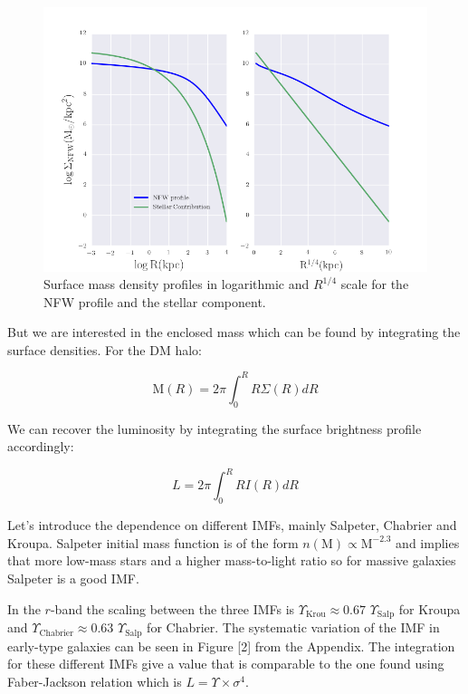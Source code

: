 \begin{figure}[]
\centering
\includegraphics[width=12cm]{images/Surface_mass_density_log.png}
\caption[Surface mass density profiles]{Surface mass density profiles in logarithmic and $R^{1/4}$ scale for the NFW profile and the stellar component.}
\end{figure}

But we are interested in the enclosed mass which can be found by integrating the surface densities. For the DM halo:

\begin{equation}
\textrm{M}(R)=2\pi \int_{0}^{R} R\Sigma(R)dR
\end{equation}

We can recover the luminosity by integrating the surface brightness profile accordingly:

\begin{equation}
L=2\pi \int_{0}^{R} RI(R)dR
\end{equation}

Let's introduce the dependence on different IMFs, mainly Salpeter, Chabrier and Kroupa. Salpeter initial mass function is of the form $n(\textrm{M})\propto \textrm{M}^{-2.3}$ and implies that more low-mass stars and a higher mass-to-light ratio so for massive galaxies  Salpeter is a good IMF. 

In the $r$-band the scaling between the three IMFs is $\Upsilon_{\text{Krou}}\approx 0.67$ $\Upsilon_{\text{Salp}}$ for Kroupa and $\Upsilon_{\text{Chabrier}}\approx 0.63$ $\Upsilon_{\text{Salp}}$ for Chabrier. The systematic variation of the IMF in early-type galaxies can be seen in Figure [2] from the Appendix. The integration for these different IMFs give a value that is comparable to the one found using Faber-Jackson relation which is $L=\Upsilon\times\sigma^{4}$. 

